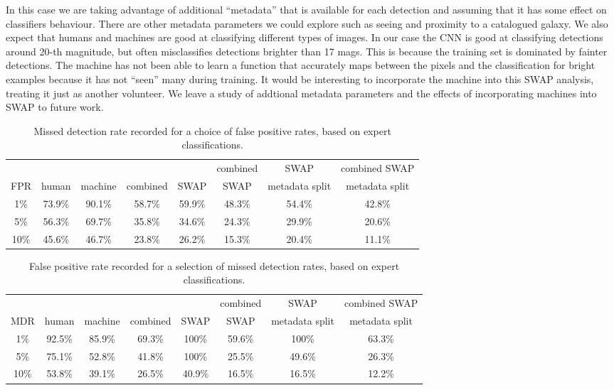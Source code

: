 \documentclass[a4paper,fleqn,usenatbib]{mnras}
\begin{document}
In this case we are taking advantage of additional “metadata” that is available for each detection and assuming that it has some effect on classifiers behaviour. There are other metadata parameters we could explore such as seeing and proximity to a catalogued galaxy.  We also expect that humans and machines are good at classifying different types of images.  In our case the CNN is good at classifying detections around 20-th magnitude, but often misclassifies detections brighter than 17 mags.  This is because the training set is dominated by fainter detections.  The machine has not been able to learn a function that accurately maps between the pixels and the classification for bright examples because it has not ``seen'' many during training.  It would be interesting to incorporate the machine into this SWAP analysis, treating it just as another volunteer.  We leave a study of addtional metadata parameters and the effects of incorporating machines into SWAP to future work.
\begin{table}
\begin{minipage}{140mm}
\centering
\begin{tabular}{|c|c|c|c|c|c|c|c|}
       &             &               &                 &           & combined  &        SWAP        &combined SWAP\\
FPR & human & machine & combined & SWAP & SWAP & metadata split &  metadata split\\
\hline
1\% & 73.9\% & 90.1\% & 58.7\% & 59.9\% & 48.3\% & 54.4\% & 42.8\%\\
5\% & 56.3\% & 69.7\% & 35.8\% & 34.6\% & 24.3\%&29.9\%&20.6\%\\
10\% & 45.6\% & 46.7\% & 23.8\% & 26.2\% & 15.3\%&20.4\%&11.1\%\\
\end{tabular}
\caption{Missed detection rate recorded for a choice of false positive rates, based on expert classifications.}
\label{tab:roc_fpr}
\end{minipage}
\end{table}

\begin{table}
\begin{minipage}{140mm}
\centering
\begin{tabular}{|c|c|c|c|c|c|c|c|}
       &             &               &                 &           & combined  &        SWAP        &combined SWAP\\
MDR & human & machine & combined & SWAP & SWAP & metadata split &  metadata split\\
\hline
1\% & 92.5\% & 85.9\% & 69.3\% & 100\% & 59.6\% & 100\% & 63.3\% \\
5\% & 75.1\% & 52.8\% & 41.8\% & 100\% & 25.5\%& 49.6\% & 26.3\%\\
10\% & 53.8\% & 39.1\% & 26.5\% & 40.9\% & 16.5\%& 16.5\% & 12.2\%\\
\end{tabular}
\caption{False positive rate recorded for a selection of missed detection rates, based on expert classifications.
}\label{tab:roc_mdr}
\end{minipage}
\end{table}
\end{document}
